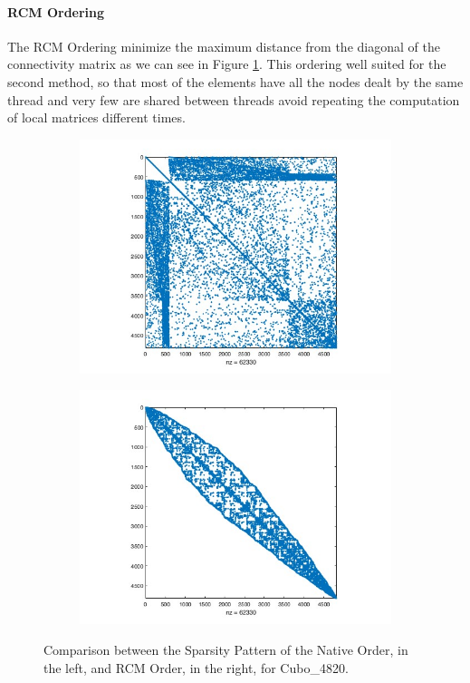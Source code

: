 \documentclass[hidelinks]{article}
\begin{document}
\paragraph{RCM Ordering}
The RCM Ordering minimize the maximum distance from the diagonal of the connectivity matrix as we can see in Figure \ref{fig:rcm}. This ordering well suited for the second method, so that most of the elements have all the nodes dealt by the same thread and very few are shared between threads avoid repeating the computation of local matrices different times.

\begin{figure}[H]
    \centering
    \begin{subfigure}{.45\textwidth}
        \includegraphics[width = \textwidth]{pic/topol4820_native.jpg}
    \end{subfigure} \hfill
    \begin{subfigure}{.45\textwidth}
        \includegraphics[width = \textwidth]{pic/topol4820_rcm.jpg}
    \end{subfigure} 
    \caption{Comparison between the Sparsity Pattern of the Native Order, in the left, and RCM Order, in the right, for Cubo\_4820.}\label{fig:rcm}
\end{figure}
\end{document}
